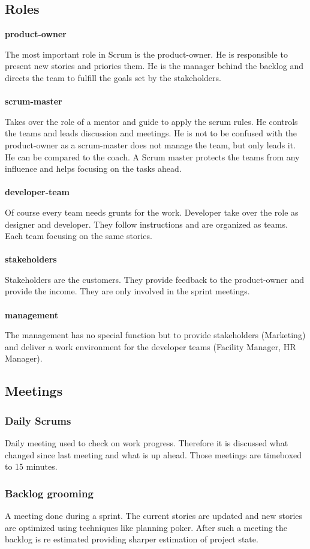 {\subsection{Roles}
\textbf{product-owner}
\par{
The most important role in Scrum is the product-owner. He is responsible to present new stories and priories them. He is the manager behind the backlog and directs the team to fulfill the goals set by the stakeholders. 
}
\\\\
\textbf{scrum-master}
\par{
Takes over the role of a mentor and guide to apply the scrum rules. He controls the teams and leads discussion and meetings. He is not to be confused with the product-owner as a scrum-master does not manage the team, but only leads it. He can be compared to the coach. A Scrum master protects the teams from any influence and helps focusing on the tasks ahead.
}
\\\\
\textbf{developer-team}
\par{
Of course every team needs grunts for the work. Developer take over the role as designer and developer. They follow instructions and are organized as teams. Each team focusing on the same stories.
}
\\\\
\textbf{stakeholders}
\par{
Stakeholders are the customers. They provide feedback to the product-owner and provide the income. They are only involved in the sprint meetings. 
}
\\\\
\textbf{management}
\par{
The management has no special function but to provide stakeholders (Marketing) and deliver a work environment for the developer teams (Facility Manager, HR Manager). 
}
\subsection{Meetings}
\subsubsection{Daily Scrums}
\par{
Daily meeting used to check on work progress. Therefore it is discussed what changed since last meeting and what is up ahead. Those meetings are timeboxed to 15 minutes.
}
\subsubsection{Backlog grooming}
\par{
A meeting done during a sprint. The current stories are updated and new stories are optimized using techniques like planning poker. After such a meeting the backlog is re estimated providing sharper estimation of project state.
}
}
